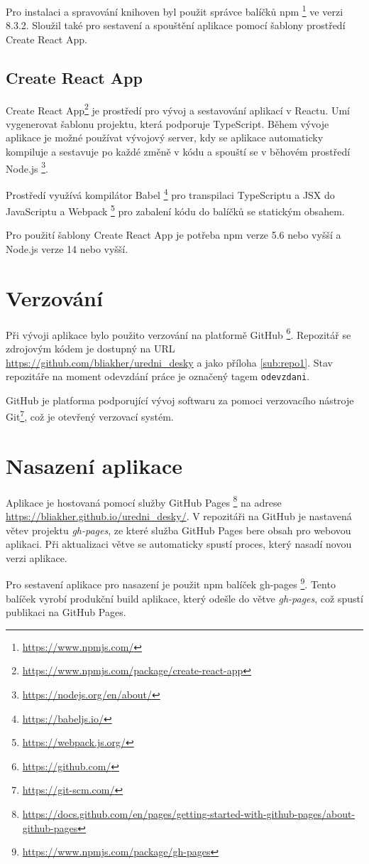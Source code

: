 Pro instalaci a spravování knihoven byl použit správce balíčků npm \footnote{\url{https://www.npmjs.com/}} ve verzi 8.3.2. Sloužil také pro sestavení a spouštění aplikace pomocí šablony prostředí Create React App.

\subsection{Create React App}\label{sub:create-react}

Create React App\footnote{\url{https://www.npmjs.com/package/create-react-app}} je prostředí pro vývoj a sestavování aplikací v Reactu. Umí vygenerovat šablonu projektu, která podporuje TypeScript. Během vývoje aplikace je možné používat vývojový server, kdy se aplikace automaticky kompiluje a sestavuje po každé změně v kódu a spouští se v běhovém prostředí Node.js \footnote{\url{https://nodejs.org/en/about/}}.

Prostředí využívá kompilátor Babel \footnote{\url{https://babeljs.io/}} pro transpilaci TypeScriptu a JSX do JavaScriptu a Webpack \footnote{\url{https://webpack.js.org/}} pro zabalení kódu do balíčků se statickým obsahem.

Pro použití šablony Create React App je potřeba npm verze 5.6 nebo vyšší a Node.js verze 14 nebo vyšší.

\section{Verzování}

Při vývoji aplikace bylo použito verzování na platformě GitHub \footnote{\url{https://github.com/}}. Repozitář se zdrojovým kódem je dostupný na URL \\ \url{https://github.com/bliakher/uredni_desky} a jako příloha \ref{sub:repo1}. Stav repozitáře na moment odevzdání práce je označený tagem \texttt{odevzdani}.

GitHub je platforma podporující vývoj softwaru za pomoci verzovacího nástroje Git\footnote{\url{https://git-scm.com/}}, což je otevřený verzovací systém.

\section{Nasazení aplikace}

Aplikace je hostovaná pomocí služby GitHub Pages \footnote{\url{https://docs.github.com/en/pages/getting-started-with-github-pages/about-github-pages}} na adrese \url{https://bliakher.github.io/uredni_desky/}. V repozitáři na GitHub je nastavená větev projektu \textit{gh-pages}, ze které služba GitHub Pages bere obsah pro webovou aplikaci. Při aktualizaci větve se automaticky spustí proces, který nasadí novou verzi aplikace.

Pro sestavení aplikace pro nasazení je použit npm balíček gh-pages \footnote{\url{https://www.npmjs.com/package/gh-pages}}. Tento balíček vyrobí produkční build aplikace, který odešle do větve \textit{gh-pages}, což spustí publikaci na GitHub Pages.


